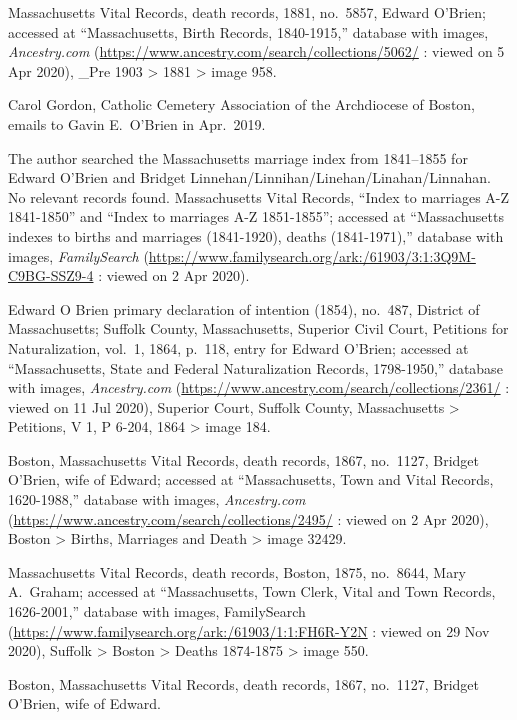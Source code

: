 \begin{thebibliography}{999}
Massachusetts Vital Records, death records, 1881, no.\ 5857, Edward O'Brien; accessed at ``Massachusetts, Birth Records, 1840-1915,'' database with images, \textit{Ancestry.com} (\url{https://www.ancestry.com/search/collections/5062/} : viewed on 5 Apr 2020), \_Pre 1903 > 1881 > image 958.

Carol Gordon, Catholic Cemetery Association of the Archdiocese of Boston, emails to Gavin E.\ O'Brien in Apr.\ 2019.

The author searched the Massachusetts marriage index from 1841--1855 for Edward O'Brien and Bridget Linnehan/Linnihan/Linehan/Linahan/Linnahan. No relevant records found.	
Massachusetts Vital Records, ``Index to marriages A-Z 1841-1850'' and ``Index to marriages A-Z 1851-1855''; accessed at ``Massachusetts indexes to births and marriages (1841-1920), deaths (1841-1971),'' database with images, \textit{FamilySearch} (\url{https://www.familysearch.org/ark:/61903/3:1:3Q9M-C9BG-SSZ9-4} : viewed on 2 Apr 2020).

Edward O Brien primary declaration of intention (1854), no.\ 487, District of Massachusetts; Suffolk County, Massachusetts, Superior Civil Court, Petitions for Naturalization, vol.\ 1, 1864, p.\ 118, entry for Edward O'Brien; accessed at ``Massachusetts, State and Federal Naturalization Records, 1798-1950,'' database with images, \textit{Ancestry.com} (\url{https://www.ancestry.com/search/collections/2361/} : viewed on 11 Jul 2020), Superior Court, Suffolk County, Massachusetts > Petitions, V 1, P 6-204, 1864 > image 184.

Boston, Massachusetts Vital Records, death records, 1867, no.\ 1127, Bridget O'Brien, wife of Edward; accessed at ``Massachusetts, Town and Vital Records, 1620-1988,'' database with images, \textit{Ancestry.com} (\url{https://www.ancestry.com/search/collections/2495/} : viewed on 2 Apr 2020), Boston > Births, Marriages and Death > image 32429.

Massachusetts Vital Records, death records, Boston, 1875, no.\ 8644, Mary A.\ Graham; accessed at ``Massachusetts, Town Clerk, Vital and Town Records, 1626-2001,'' database with images, FamilySearch (\url{https://www.familysearch.org/ark:/61903/1:1:FH6R-Y2N} : viewed on 29 Nov 2020), Suffolk > Boston > Deaths 1874-1875 > image 550. 

Boston, Massachusetts Vital Records, death records, 1867, no.\ 1127, Bridget O'Brien, wife of Edward.


\end{thebibliography}
